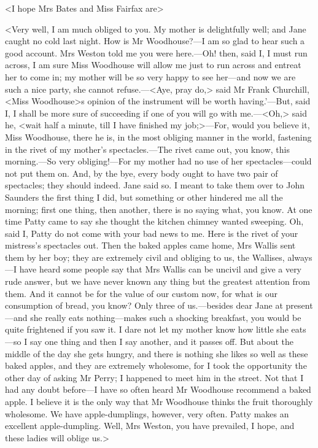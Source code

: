 <I hope Mrs Bates and Miss Fairfax are\longdash>

<Very well, I am much obliged to you. My mother is delightfully well; and Jane caught no cold last night. How is Mr Woodhouse?—I am so glad to hear such a good account. Mrs Weston told me you were here.—Oh! then, said I, I must run across, I am sure Miss Woodhouse will allow me just to run across and entreat her to come in; my mother will be so very happy to see her—and now we are such a nice party, she cannot refuse.—<Aye, pray do,> said Mr Frank Churchill, <Miss Woodhouse>s opinion of the instrument will be worth having.'—But, said I, I shall be more sure of succeeding if one of you will go with me.—<Oh,> said he, <wait half a minute, till I have finished my job;>—For, would you believe it, Miss Woodhouse, there he is, in the most obliging manner in the world, fastening in the rivet of my mother's spectacles.—The rivet came out, you know, this morning.—So very obliging!—For my mother had no use of her spectacles—could not put them on. And, by the bye, every body ought to have two pair of spectacles; they should indeed. Jane said so. I meant to take them over to John Saunders the first thing I did, but something or other hindered me all the morning; first one thing, then another, there is no saying what, you know. At one time Patty came to say she thought the kitchen chimney wanted sweeping. Oh, said I, Patty do not come with your bad news to me. Here is the rivet of your mistress's spectacles out. Then the baked apples came home, Mrs Wallis sent them by her boy; they are extremely civil and obliging to us, the Wallises, always—I have heard some people say that Mrs Wallis can be uncivil and give a very rude answer, but we have never known any thing but the greatest attention from them. And it cannot be for the value of our custom now, for what is our consumption of bread, you know? Only three of us.—besides dear Jane at present—and she really eats nothing—makes such a shocking breakfast, you would be quite frightened if you saw it. I dare not let my mother know how little she eats—so I say one thing and then I say another, and it passes off. But about the middle of the day she gets hungry, and there is nothing she likes so well as these baked apples, and they are extremely wholesome, for I took the opportunity the other day of asking Mr Perry; I happened to meet him in the street. Not that I had any doubt before—I have so often heard Mr Woodhouse recommend a baked apple. I believe it is the only way that Mr Woodhouse thinks the fruit thoroughly wholesome. We have apple-dumplings, however, very often. Patty makes an excellent apple-dumpling. Well, Mrs Weston, you have prevailed, I hope, and these ladies will oblige us.>

